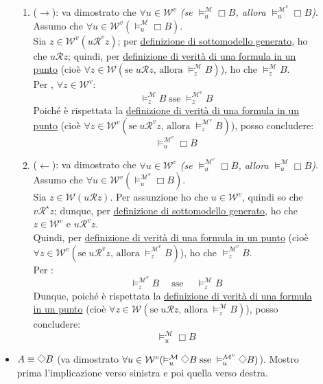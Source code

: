 \documentclass[a4paper,12pt]{article}
\newcommand{\latinmath}[1]{\text{\latinmodern{#1}}} %
\newcommand{\Dmd}{\mathord{\vcenter{\hbox{\tikz[baseline=-0.6ex]{\draw[line width=0.4pt, scale=1, rotate=45] (0,0) rectangle (0.2,0.2);}}}}} %
\begin{document}
\begin{dimo}
\begin{description}
\begin{itemize}
\begin{enumerate}
				\item ($\to$): va dimostrato che \emph{$\forall u \in \mathcal{W}^{v}$ (se $\vDash_u^{\mathcal{M}} \Box B$, allora $\vDash_u^{\mathcal{M}^{v}} \Box B$)}. \\
				Assumo che $\forall u \in \mathcal{W}^{v} (\vDash_u^{\mathcal{M}} \Box B)$. \\
				Sia $z \in \mathcal{W}^{v} (u\mathcal{R}^{v}z)$; per \hyperlink{modgen}{definizione di sottomodello generato}, ho che $u\mathcal{R}z$; quindi, per \hyperlink{defverp}{definizione di verità di una formula in un punto} (cioè $\forall z \in \mathcal{W} (\text{se} \; u\mathcal{R}z \text{, allora} \; \vDash_z^{\mathcal{M}} B)$), ho che $\vDash_z^{\mathcal{M}} B$. \\
				Per \latinmath{IH1}, $\forall z \in \mathcal{W}^{v}$:
				$$\vDash_z^{\mathcal{M}} B\; \text{sse} \; \vDash_z^{\mathcal{M}^{v}} B$$
				Poiché è rispettata la \hyperlink{defverp}{definizione di verità di una formula in un punto} (cioè $\forall z \in \mathcal{W}^v (\text{se} \; u\mathcal{R}^vz \text{, allora} \; \vDash_z^{\mathcal{M}^v} B)$), posso concludere: 
				$$\vDash_u^{\mathcal{M}^{v}} \Box B$$
				\item ($\leftarrow$): va dimostrato che \emph{$\forall u \in \mathcal{W}^{v}$ (se $\vDash_u^{\mathcal{M}^{v}} \Box B$, allora $\vDash_u^{\mathcal{M}} \Box B$)}. \\
				Assumo che $\forall u \in \mathcal{W}^{v} (\vDash_u^{\mathcal{M}^{v}} \Box B)$. \\
				Sia $z \in \mathcal{W} (u\mathcal{R}z)$. Per assunzione ho che $u \in \mathcal{W}^{v}$, quindi so che $v\mathcal{R}^{\star}z$; dunque, per \hyperlink{modgen}{definizione di sottomodello generato}, ho che $z \in \mathcal{W}^{v}$ e $u\mathcal{R}^{v}z$. \\
				Quindi, per \hyperlink{defverp}{definizione di verità di una formula in un punto} (cioè $\forall z \in \mathcal{W}^{v} (\text{se} \; u\mathcal{R}^{v}z \text{, allora} \; \vDash_z^{\mathcal{M}^{v}} B)$), ho che $\vDash_z^{\mathcal{M}^{v}} B$. \\
				Per \latinmath{IH1}: $$\vDash_z^{\mathcal{M}^{v}} B \quad \; \text{sse} \quad \; \vDash_z^{\mathcal{M}} B$$
				Dunque, poiché è rispettata la \hyperlink{defverp}{definizione di verità di una formula in un punto} (cioè $\forall z \in \mathcal{W} (\text{se} \; u\mathcal{R}z \text{, allora} \; \vDash_z^{\mathcal{M}} B)$), posso concludere:
				$$\vDash_u^{\mathcal{M}} \Box B$$
			\end{enumerate}
			\item $A \equiv \Dmd B$ (va dimostrato \emph{$\forall u \in \mathcal{W}^{v} (\vDash_u^{\mathcal{M}} \Dmd B \; \text{sse} \; \vDash_u^{\mathcal{M}^{v}} \Dmd B)$}). Mostro prima l'implicazione verso sinistra e poi quella verso destra. 

\end{itemize}
\end{description}
\end{dimo}
\end{document}
